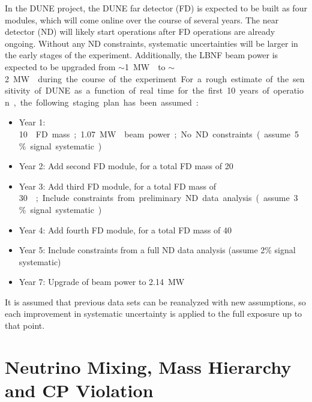 In the DUNE project, the  DUNE far detector (FD) is expected to
be built as four  modules, which will come online over the course
of several years.  The near detector (ND) will likely start operations
after FD operations are already ongoing.  Without any ND constraints,
systematic uncertainties will be larger in the early stages of the
experiment. Additionally, the LBNF beam power is expected to be upgraded
from $\sim$\SI{1}\MW{} to $\sim$\SI{2}\MW{} during the course of the experiment. For
a rough estimate of the sensitivity of DUNE as a function of real time
for the first \num{10} years of operation, the following staging plan has
been assumed:
\begin{itemize}
 \item Year 1: \SI{10}\kt{} FD mass; \SI{1.07}\MW{} beam power; No ND constraints (assume \num{5}\% signal systematic)
 \item Year 2: Add second  FD module, for a total FD mass of \SI{20}\kt
 \item Year 3: Add third  FD module, for a total FD mass of \SI{30}\kt; Include constraints from preliminary ND data analysis (assume \num{3}\% signal systematic)
 \item Year 4: Add fourth  FD module, for a total FD mass of \SI{40}\kt
 \item Year 5: Include constraints from a full ND data analysis (assume \num{2}\% signal systematic)
 \item Year 7: Upgrade of beam power to \SI{2.14}\MW
\end{itemize}
It is assumed that previous data sets can be reanalyzed with new
assumptions, so each improvement in systematic uncertainty is applied
to the full exposure up to that point.


\section{Neutrino Mixing, Mass Hierarchy and CP Violation}


